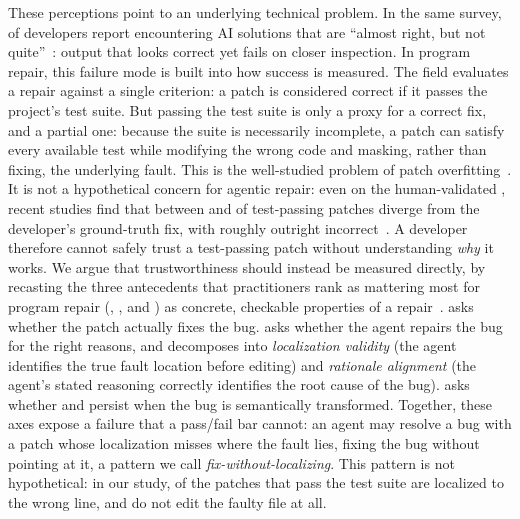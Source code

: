 These perceptions point to an underlying technical problem. In the same survey,
\aiAlmostRight{} of developers report encountering AI solutions that are ``almost right,
but not quite''~\cite{so2025}: output that looks correct yet fails on closer inspection. In program
repair, this failure mode is built into how success is measured. The field evaluates a
repair against a single criterion: a patch is considered correct if it passes the
project's test suite. But passing the test suite is only a proxy for a correct fix, and a
partial one: because the suite is necessarily incomplete, a patch can satisfy every
available test while modifying the wrong code and masking, rather than fixing, the
underlying fault. This is the well-studied problem of patch
overfitting~\cite{smith2015overfitting, qi2015analysis}. It is not a hypothetical concern
for agentic repair: even on the human-validated \sweBenchVerified{}, recent studies
find that between \divergeLow{} and \divergeHigh{} of test-passing patches diverge from the
developer's ground-truth fix, with roughly \certIncorrect{} outright
incorrect~\cite{wang2026solved, yu2025utboost}. A developer therefore cannot safely trust a
test-passing patch without understanding \emph{why} it works. We argue that
trustworthiness should instead be measured directly, by recasting the three antecedents
that practitioners rank as mattering most for program repair (\accuracy{}, \interpretability{},
and \robustness{}) as concrete, checkable properties of a repair~\cite{khati2025mapping}.
\accuracy{} asks whether the patch actually fixes the bug. \interpretability{}
asks whether the agent repairs the bug for the right reasons, and decomposes into
\emph{localization validity} (the agent identifies the true fault location before editing)
and \emph{rationale alignment} (the agent's stated reasoning correctly identifies the root
cause of the bug). \robustness{} asks whether \accuracy{} and \interpretability{} persist
when the bug is semantically transformed. Together, these axes expose a failure that a
pass/fail bar cannot: an agent may resolve a bug with a patch whose localization misses
where the fault lies, fixing the bug without pointing at it, a pattern we call
\emph{fix-without-localizing}. This pattern is not hypothetical: in our study, \mislocRate{}
of the patches that pass the test suite are localized to the wrong line, and \wrongFileRate{}
do not edit the faulty file at all.

